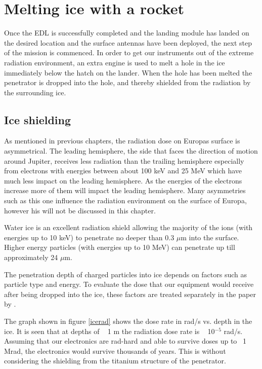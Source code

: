 \section{Melting ice with a rocket}

Once the EDL is successfully completed and the landing module has landed on the desired location and the surface antennas have been deployed, the next step of the mission is commenced. In order to get our instruments out of the extreme radiation environment, an extra engine is used to melt a hole in the ice immediately below the hatch on the lander. When the hole has been melted the penetrator is dropped into the hole, and thereby shielded from the radiation by the surrounding ice. 

\subsection{Ice shielding}

As mentioned in previous chapters, the radiation dose on Europas surface is asymmetrical. The leading hemisphere, the side that faces the direction of motion around Jupiter, receives less radiation than the trailing hemisphere especially from electrons with energies between about 100 keV and
25 MeV which have much less impact on the leading hemisphere. As the energies of the electrons increase more of them will impact the leading hemisphere. Many asymmetries such as this one influence the radiation environment on the surface of Europa, however his will not be discussed in this chapter. 


Water ice is an excellent radiation shield allowing the majority of the ions (with energies up to 10 keV) to penetrate no deeper than 0.3 $\mu$m into the surface. Higher energy particles (with energies up to 10 MeV) can penetrate up till approximately 24 $\mu$m. \cite{Paranicas_2009}

The penetration depth of charged particles into ice depends on factors such as particle type and energy. To evaluate the dose that our equipment would receive after being dropped into the ice, these factors are treated separately in the paper by  \cite{Paranicas_2009}.

The graph shown in figure \ref{icerad} shows the dose rate in rad/s vs. depth in the ice. 
It is seen that at depths of ~ 1 m the radiation dose rate is ~ 10$^{-5}$ rad/s. Assuming that our electronics are rad-hard and able to survive doses up to ~1 Mrad, the electronics would survive thousands of years. This is without considering the shielding from the titanium structure of the penetrator. 

